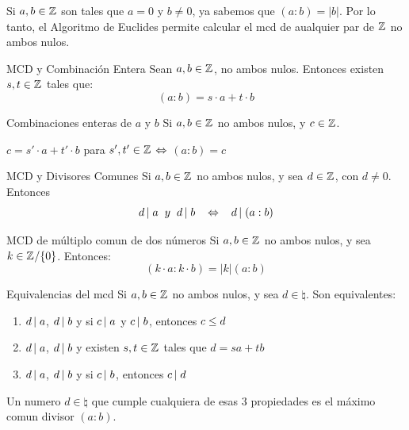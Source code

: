 \documentclass[10pt]{article}
\begin{document}
\begin{obs}{}
 Si $a, b \in \entero{}$ son tales que $a=0$ y $b \neq 0$, ya sabemos que $(a:b) = |b|$. Por lo tanto, el Algoritmo de Euclides permite calcular el mcd de aualquier par de $\entero{}$ no ambos nulos.
\end{obs}

\begin{teo}{MCD y Combinación Entera}
 Sean $a, b \in \entero{}$, no ambos nulos. Entonces existen $s, t \in \entero{}$ tales que:
 \[(a:b) = s \cdot a + t \cdot b\]
\end{teo}

\begin{obs}{Combinaciones enteras de $a$ y $b$}
Si $a, b \in \entero{}$ no ambos nulos, y $c \in \entero{}$.
\begin{center}
 $c = s' \cdot a + t' \cdot b$ para $s', t' \in \entero{}$ $\sii$ $(a:b) = c$
\end{center}
\end{obs}

\begin{propo}{MCD y Divisores Comunes}
Si $a, b \in \entero{}$ no ambos nulos,  y sea $d \in \entero{}$, con $d \neq 0$. Entonces
\[\divi{d}{a} \es{0.2} y \es{0.2} \divi{d}{b} \es{0.3} \sii \es{0.3} \divi{d}{(a:b)}\]
\end{propo}

\begin{propo}{MCD de múltiplo comun de dos números}
 Si $a, b \in \entero{}$ no ambos nulos, y sea $k \in \entero{} / \{0\}$. Entonces:
 \[(k \cdot a : k \cdot b) = |k| (a:b)\]
\end{propo}

\begin{teo}{Equivalencias del mcd}
 Si $a, b \in \entero{}$ no ambos nulos,  y sea $d \in \natural{}$. Son equivalentes:
 \begin{enumerate}
  \item $\divi{d}{a}$, $\divi{d}{b}$ y si $\divi{c}{a}$ y $\divi{c}{b}$, entonces $c \menig d$
  \item $\divi{d}{a}$, $\divi{d}{b}$ y existen $s, t \in \entero{}$ tales que 
  $d = s a + t b$
  \item $\divi{d}{a}$, $\divi{d}{b}$ y si $\divi{c}{b}$, entonces $\divi{c}{d}$
 \end{enumerate}
Un numero $d \in \natural{}$ que cumple cualquiera de esas $3$ propiedades es el máximo comun divisor $(a:b)$.
\end{teo}
\end{document}
